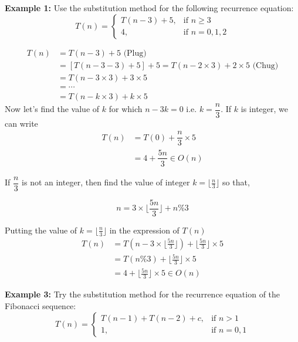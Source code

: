 \documentclass[a4paper,11pt]{book}
\begin{document}
\noindent \textbf{Example 1:} Use the substitution method for the following recurrence equation:
\[
   T(n) = 
\begin{cases}
    T(n-3) + 5, & \text{if }  n \geq 3\\
    4,          & \text{if }  n = 0, 1, 2
\end{cases}
\]

\begin{align*}
	T(n) &= T(n-3) + 5 \text{   (Plug)}\\
	     &= \left[T(n-3-3) + 5\right] + 5 = T(n-2 \times 3) + 2\times 5 \text{   (Chug)}\\
	     &= T(n-3 \times 3) + 3\times 5\\
	     &= \cdots\\
	     &= T(n-k \times 3) + k \times 5
\end{align*}
Now let's find the value of $k$ for which $n-3k = 0$ i.e. $k=\dfrac{n}{3}$. If $k$ is integer, we can write
\begin{align*}
	T(n) &= T(0) + \dfrac{n}{3}\times 5\\
	     &= 4 + \dfrac{5n}{3} \in O(n)
\end{align*}

\noindent If $\dfrac{n}{3}$ is not an integer, then find the value of integer $k = \lfloor \frac{n}{3} \rfloor$ so that,

$$n = 3\times\lfloor \frac{5n}{3} \rfloor + n\%3 $$

\noindent Putting the value of $k= \lfloor \frac{n}{3} \rfloor$ in the expression of $T(n)$
\begin{align*}
	T(n) &= T\left(n - 3\times\lfloor \frac{5n}{3} \rfloor\right) + \lfloor \frac{5n}{3} \rfloor \times 5\\
	     &= T(n\%3) + \lfloor \frac{5n}{3} \rfloor \times 5\\
	     &= 4 + \lfloor \frac{5n}{3} \rfloor \times 5 \in O(n)
\end{align*}

\noindent \textbf{Example 3:} Try the substitution method for the recurrence equation of the Fibonacci sequence:
\[
   T(n) = 
\begin{cases}
    T(n-1) + T(n-2) + c, & \text{if } n > 1\\
    1,                   & \text{if } n = 0, 1
\end{cases}
\]
\end{document}
